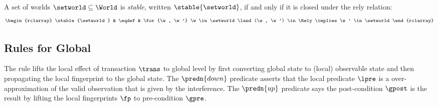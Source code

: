 \begin{defn}[Stable]
A set of worlds $\setworld \subseteq \World$ is \emph{stable}, written $\stable{\setworld}$, if and only if it is closed under the rely relation: 
\[
    \begin{rclarray}
        \stable{\setworld} & \eqdef & \for{\w, \w'}  \w \in \setworld \land (\w, \w') \in \Rely \implies \w' \in \setworld
    \end{rclarray}
\]
\end{defn}

\subsection{Rules for Global}

The  rule lifts the local effect of transaction \( \trans \) to global level by first converting global state to (local) observable state and then propagating the local fingerprint to the global state.
The \( \predn{down} \) predicate asserts that the local predicate \( \lpre \) is a over-approximation of the valid observation that is given by the interference.
The \( \predn{up} \) predicate says the post-condition \( \gpost \) is the result by lifting the local fingerprints \( \fp \) to pre-condition \( \gpre \).



